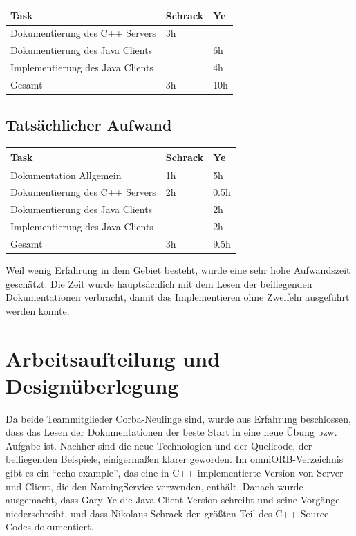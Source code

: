 \documentclass[11pt]{article}
\begin{document}
\begin{center}
  \begin{tabular}{| l | l | l |}
    \hline
    Task & Schrack & Ye \\ \hline

    Dokumentierung des C++ Servers   & 3h & \\ \hline
    Dokumentierung des Java Clients  & & 6h \\ \hline
    Implementierung des Java Clients & & 4h \\ \hline \hline
    Gesamt & 3h & 10h \\ \hline
  \end{tabular}
\end{center}

\subsection{Tatsächlicher Aufwand}
\begin{center}
  \begin{tabular}{| l | l | l |}
    \hline
    Task & Schrack & Ye \\ \hline
    Dokumentation Allgemein          & 1h & 5h \\ \hline
    Dokumentierung des C++ Servers   & 2h & 0.5h\\ \hline
    Dokumentierung des Java Clients  & & 2h \\ \hline
    Implementierung des Java Clients & & 2h \\ \hline \hline
    Gesamt & 3h & 9.5h \\ \hline
  \end{tabular}
\end{center}

Weil wenig Erfahrung in dem Gebiet besteht, wurde eine sehr hohe Aufwandszeit geschätzt. Die Zeit wurde hauptsächlich mit dem Lesen der beiliegenden Dokumentationen \cite{omniorbuserguide} verbracht, damit das Implementieren ohne Zweifeln ausgeführt werden konnte.

\section{Arbeitsaufteilung und Designüberlegung}
Da beide Teammitglieder Corba-Neulinge sind, wurde aus Erfahrung beschlossen, dass das Lesen der Dokumentationen der beste Start in eine neue Übung bzw. Aufgabe ist. Nachher sind die neue Technologien und der Quellcode, der beiliegenden Beispiele, einigermaßen klarer geworden. Im omniORB-Verzeichnis gibt es ein ``echo-example'', das eine in C++ implementierte Version von Server und Client, die den NamingService verwenden, enthält. Danach wurde ausgemacht, dass Gary Ye die Java Client Version schreibt und seine Vorgänge niederschreibt, und dass Nikolaus Schrack den größten Teil des C++ Source Codes dokumentiert. 
\end{document}
